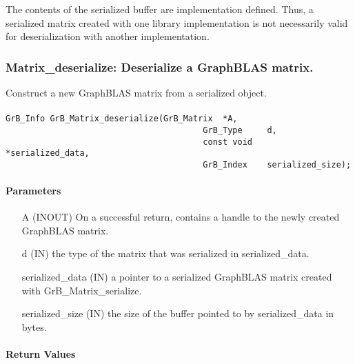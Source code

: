 The contents of the serialized buffer are implementation defined.  Thus, a
serialized matrix created with one library implementation is not necessarily
valid for deserialization with another implementation.


\subsubsection{{\sf Matrix\_deserialize}: Deserialize a GraphBLAS matrix. }
\label{Sec:Matrix_deserialize}

Construct a new GraphBLAS matrix from a serialized object.

\paragraph{\syntax}

\begin{Verbatim}[samepage=true]
        GrB_Info GrB_Matrix_deserialize(GrB_Matrix  *A,
                                        GrB_Type     d,
                                        const void        *serialized_data,
                                        GrB_Index    serialized_size);
\end{Verbatim}

\paragraph{Parameters}

\begin{itemize}[leftmargin=1.1in]
    \item[{\sf A}]      ({\sf INOUT}) On a successful return, contains a handle to the newly created GraphBLAS matrix.
    \item[{\sf d}]      ({\sf IN}) the type of the matrix that was serialized in {\sf serialized\_data}. 
    \item[{\sf serialized\_data}] ({\sf IN}) a pointer to a serialized GraphBLAS matrix created with {\sf GrB\_Matrix\_serialize}.
    \item[{\sf serialized\_size}]  ({\sf IN}) the size of the buffer pointed to by {\sf serialized\_data} in bytes.
\end{itemize}
\paragraph{Return Values}

